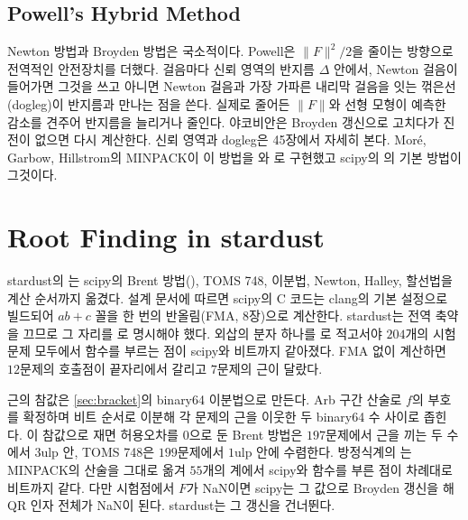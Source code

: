 \subsection{Powell's Hybrid Method}

Newton 방법과 Broyden 방법은 국소적이다. Powell은 $\|F\|^2/2$을 줄이는 방향으로 전역적인 안전장치를 더했다\cite{powell1970hybrid}. 걸음마다 신뢰 영역의 반지름 $\Delta$ 안에서, Newton 걸음이 들어가면 그것을 쓰고 아니면 Newton 걸음과 가장 가파른 내리막 걸음을 잇는 꺾은선(dogleg)이 반지름과 만나는 점을 쓴다. 실제로 줄어든 $\|F\|$와 선형 모형이 예측한 감소를 견주어 반지름을 늘리거나 줄인다. 야코비안은 Broyden 갱신으로 고치다가 진전이 없으면 다시 계산한다. 신뢰 영역과 dogleg은 45장에서 자세히 본다. Moré, Garbow, Hillstrom의 MINPACK이 이 방법을 와 로 구현했고\cite{more1980minpack} scipy의 의 기본 방법이 그것이다.

\section{Root Finding in stardust}
\label{sec:roots-stardust}

\begin{instardust}
stardust의 는 scipy의 Brent 방법(), TOMS 748, 이분법, Newton, Halley, 할선법을 계산 순서까지 옮겼다. 설계 문서에 따르면 scipy의 C 코드는 clang의 기본 설정으로 빌드되어 $ab+c$ 꼴을 한 번의 반올림(FMA, 8장)으로 계산한다. stardust는 전역 축약을 끄므로 그 자리를 로 명시해야 했다. 외삽의 분자 하나를 로 적고서야 $204$개의 시험 문제 모두에서 함수를 부르는 점이 scipy와 비트까지 같아졌다. FMA 없이 계산하면 $12$문제의 호출점이 끝자리에서 갈리고 $7$문제의 근이 달랐다.
\end{instardust}

\begin{instardust}
근의 참값은 \cref{sec:bracket}의 binary64 이분법으로 만든다. Arb 구간 산술로 $f$의 부호를 확정하며 비트 순서로 이분해 각 문제의 근을 이웃한 두 binary64 수 사이로 좁힌다. 이 참값으로 재면 허용오차를 $0$으로 둔 Brent 방법은 $197$문제에서 근을 끼는 두 수에서 $3$ulp 안, TOMS 748은 $199$문제에서 $1$ulp 안에 수렴한다. 방정식계의 는 MINPACK의 산술을 그대로 옮겨 $55$개의 계에서 scipy와 함수를 부른 점이 차례대로 비트까지 같다. 다만 시험점에서 $F$가 NaN이면 scipy는 그 값으로 Broyden 갱신을 해 QR 인자 전체가 NaN이 된다. stardust는 그 갱신을 건너뛴다.
\end{instardust}

